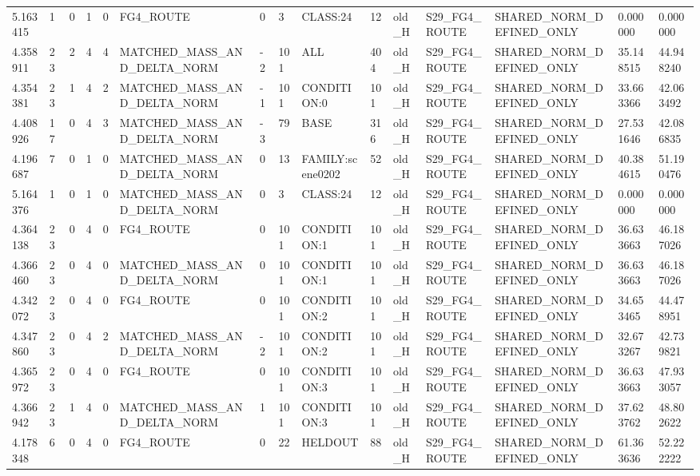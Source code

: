 \begin{tabular}{lllllllllllllll}
5.163415 & 1 & 0 & 1 & 0 & FG4\_ROUTE & 0 & 3 & CLASS:24 & 12 & old\_H & S29\_FG4\_ROUTE & SHARED\_NORM\_DEFINED\_ONLY & 0.000000 & 0.000000 \\
4.358911 & 23 & 2 & 4 & 4 & MATCHED\_MASS\_AND\_DELTA\_NORM & -2 & 101 & ALL & 404 & old\_H & S29\_FG4\_ROUTE & SHARED\_NORM\_DEFINED\_ONLY & 35.148515 & 44.948240 \\
4.354381 & 23 & 1 & 4 & 2 & MATCHED\_MASS\_AND\_DELTA\_NORM & -1 & 101 & CONDITION:0 & 101 & old\_H & S29\_FG4\_ROUTE & SHARED\_NORM\_DEFINED\_ONLY & 33.663366 & 42.063492 \\
4.408926 & 17 & 0 & 4 & 3 & MATCHED\_MASS\_AND\_DELTA\_NORM & -3 & 79 & BASE & 316 & old\_H & S29\_FG4\_ROUTE & SHARED\_NORM\_DEFINED\_ONLY & 27.531646 & 42.086835 \\
4.196687 & 7 & 0 & 1 & 0 & MATCHED\_MASS\_AND\_DELTA\_NORM & 0 & 13 & FAMILY:scene0202 & 52 & old\_H & S29\_FG4\_ROUTE & SHARED\_NORM\_DEFINED\_ONLY & 40.384615 & 51.190476 \\
5.164376 & 1 & 0 & 1 & 0 & MATCHED\_MASS\_AND\_DELTA\_NORM & 0 & 3 & CLASS:24 & 12 & old\_H & S29\_FG4\_ROUTE & SHARED\_NORM\_DEFINED\_ONLY & 0.000000 & 0.000000 \\
4.364138 & 23 & 0 & 4 & 0 & FG4\_ROUTE & 0 & 101 & CONDITION:1 & 101 & old\_H & S29\_FG4\_ROUTE & SHARED\_NORM\_DEFINED\_ONLY & 36.633663 & 46.187026 \\
4.366460 & 23 & 0 & 4 & 0 & MATCHED\_MASS\_AND\_DELTA\_NORM & 0 & 101 & CONDITION:1 & 101 & old\_H & S29\_FG4\_ROUTE & SHARED\_NORM\_DEFINED\_ONLY & 36.633663 & 46.187026 \\
4.342072 & 23 & 0 & 4 & 0 & FG4\_ROUTE & 0 & 101 & CONDITION:2 & 101 & old\_H & S29\_FG4\_ROUTE & SHARED\_NORM\_DEFINED\_ONLY & 34.653465 & 44.478951 \\
4.347860 & 23 & 0 & 4 & 2 & MATCHED\_MASS\_AND\_DELTA\_NORM & -2 & 101 & CONDITION:2 & 101 & old\_H & S29\_FG4\_ROUTE & SHARED\_NORM\_DEFINED\_ONLY & 32.673267 & 42.739821 \\
4.365972 & 23 & 0 & 4 & 0 & FG4\_ROUTE & 0 & 101 & CONDITION:3 & 101 & old\_H & S29\_FG4\_ROUTE & SHARED\_NORM\_DEFINED\_ONLY & 36.633663 & 47.933057 \\
4.366942 & 23 & 1 & 4 & 0 & MATCHED\_MASS\_AND\_DELTA\_NORM & 1 & 101 & CONDITION:3 & 101 & old\_H & S29\_FG4\_ROUTE & SHARED\_NORM\_DEFINED\_ONLY & 37.623762 & 48.802622 \\
4.178348 & 6 & 0 & 4 & 0 & FG4\_ROUTE & 0 & 22 & HELDOUT & 88 & old\_H & S29\_FG4\_ROUTE & SHARED\_NORM\_DEFINED\_ONLY & 61.363636 & 52.222222 \\

\end{tabular}
